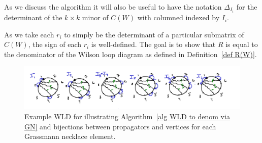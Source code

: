 \documentclass[11pt]{article}
\theoremstyle{remark}
\theoremstyle{definition}
\begin{document}
As we discuss the algorithm it will also be useful to have the notation $\Delta_{I_i}$ for the determinant of the $k\times k$ minor of $C(W)$ with columned indexed by $I_i$.

As we take each $r_i$ to simply be the determinant of a particular submatrix of $C(W)$, the sign of each $r_i$ is well-defined.  The goal is to show that $R$ is equal to the denominator of the Wilson loop diagram as defined in Definition~\ref{def R(W)}.

\begin{figure}
\includegraphics{egWLD_forR}
\caption{Example WLD for illustrating Algorithm~\ref{alg WLD to denom via GN} and bijections between propagators and vertices for each Grassmann necklace element.}\label{fig R eg}
\end{figure}
\end{document}
